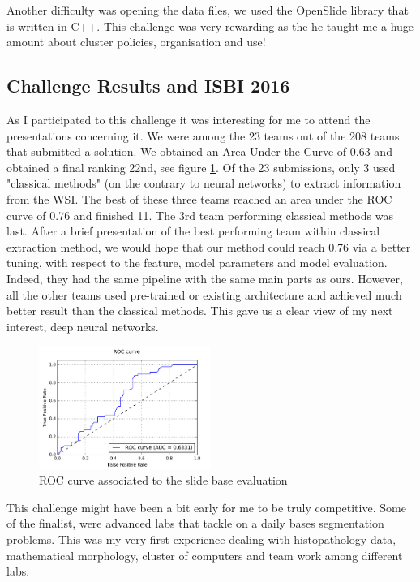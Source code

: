 \documentclass[a4paper,10pt]{article}
\begin{document}
Another difficulty was opening the data files, we used the OpenSlide library that is written in C++.
This challenge was very rewarding as the he taught me a huge amount about cluster policies, organisation and use!


\subsection{Challenge Results and ISBI 2016}

As I participated to this challenge it was interesting for me to attend the presentations concerning it. We were among the 23 teams out of the 208 teams that submitted a solution. We obtained an Area Under the Curve of 0.63 and obtained a final ranking 22nd, see figure \ref{Eval: ROC}. Of the 23 submissions, only 3 used "classical methods" (on the contrary to neural networks) to extract information from the WSI. The best of these three teams reached an area under the ROC curve of 0.76 and finished 11. The 3rd team performing classical methods was last. After a brief presentation of the best performing team within classical extraction method, we would hope that our method could reach 0.76 via a better tuning, with respect to the feature, model parameters and model evaluation. Indeed, they had the same pipeline with the same main parts as ours. However, all the other teams used pre-trained or existing architecture and achieved much better result than the classical methods. This gave us a clear view of my next interest, deep neural networks.

\begin{figure}[!ht]
\centering
\includegraphics[width=0.5\textwidth]{ROC.png}
\caption{ROC curve associated to the slide base evaluation}
\label{Eval: ROC}
\end{figure}

This challenge might have been a bit early for me to be truly competitive. Some of the finalist, were advanced labs that tackle on a daily bases segmentation problems. This was my very first experience dealing with histopathology data, mathematical morphology, cluster of computers and team work among different labs. 
\end{document}
